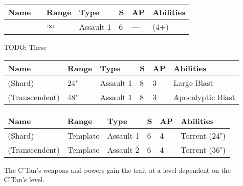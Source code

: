 
\label{Harp of Dissonance}
\noindent
\begin{tabular}{||m{130pt} m{10pt} m{31pt} m{55pt} m{12pt} m{12pt} m{210pt}||}
	\hline
	Name & & Range & Type & S & AP & Abilities \\
	\hline
	\quickref{Harp of Dissonance} & & $\infty$ & Assault 1 & 6 & — & \quickref{Entropic Strike} (4+) \\
	\hline
\end{tabular}


TODO: These



 \label{Powers of the C'Tan}


 \label{Antimatter Meteor}

\noindent
\begin{tabular}{||m{160pt} m{31pt} m{55pt} m{12pt} m{12pt} m{200pt}||}
	\hline
	Name & Range & Type & S & AP & Abilities \\
	\hline
	\quickref{Antimatter Meteor} (Shard) & 24" & Assault 1 & 8 & 3 & Large Blast \\
	\quickref{Antimatter Meteor} (Transcendent) & 48" & Assault 1 & 8 & 3 & Apocalyptic Blast \\
	\hline
\end{tabular}

 \label{Cosmic Fire}

\noindent
\begin{tabular}{||m{160pt} m{31pt} m{55pt} m{12pt} m{12pt} m{200pt}||}
	\hline
	Name & Range & Type & S & AP & Abilities \\
	\hline
	\quickref{Cosmic Fire} (Shard) & Template & Assault 1 & 6 & 4 & Torrent (24") \\
	\quickref{Cosmic Fire} (Transcendent) & Template & Assault 2 & 6 & 4 & Torrent (36") \\
	\hline
\end{tabular}

 \label{Entropic Touch}

The C'Tan's weapons and powers gain the  trait at a level dependent on the C'Tan's level.

